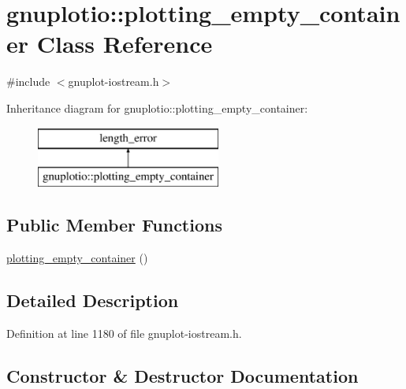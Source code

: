 \hypertarget{classgnuplotio_1_1plotting__empty__container}{}\section{gnuplotio\+:\+:plotting\+\_\+empty\+\_\+container Class Reference}
\label{classgnuplotio_1_1plotting__empty__container}


{\ttfamily \#include $<$gnuplot-\/iostream.\+h$>$}

Inheritance diagram for gnuplotio\+:\+:plotting\+\_\+empty\+\_\+container\+:\begin{figure}[H]
\begin{center}
\leavevmode
\includegraphics[height=2.000000cm]{classgnuplotio_1_1plotting__empty__container}
\end{center}
\end{figure}
\subsection*{Public Member Functions}
\begin{DoxyCompactItemize}
\item 
\hyperlink{classgnuplotio_1_1plotting__empty__container_ac6498c9ce44e48757444c8335fb544a1}{plotting\+\_\+empty\+\_\+container} ()
\end{DoxyCompactItemize}


\subsection{Detailed Description}


Definition at line 1180 of file gnuplot-\/iostream.\+h.



\subsection{Constructor \& Destructor Documentation}
